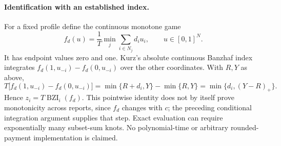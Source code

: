 \documentclass[11pt]{article}
\theoremstyle{definition}\newtheorem{definition}[theorem]{Definition}
\theoremstyle{remark}\newtheorem{remark}[theorem]{Remark}
\begin{document}
\paragraph{Identification with an established index.}
For a fixed profile define the continuous monotone game
\[
 f_d(u)=\frac1T\min_j\sum_{i\in N_j}d_iu_i,\qquad u\in[0,1]^N.
\]
It has endpoint values zero and one. Kurz's absolute continuous Banzhaf
index integrates $f_d(1,u_{-i})-f_d(0,u_{-i})$ over the other coordinates.
With $R,Y$ as above,
\[
 T\bigl[f_d(1,u_{-i})-f_d(0,u_{-i})\bigr]
 =\min\{R+d_i,Y\}-\min\{R,Y\}=\min\{d_i,(Y-R)_+\}.
\]
Hence $z_i=T\operatorname{BZI}_i(f_d)$. This pointwise identity does not
by itself prove monotonicity across reports, since $f_d$ changes with $c$;
the preceding conditional integration argument supplies that step.
Exact evaluation can require exponentially many subset-sum knots. No
polynomial-time or arbitrary rounded-payment implementation is claimed.
\end{document}
